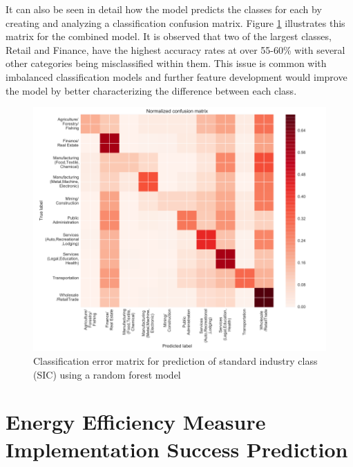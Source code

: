 It can also be seen in detail how the model predicts the classes for each by creating and analyzing a classification confusion matrix. Figure \ref{fig:industry_classification} illustrates this matrix for the combined model. It is observed that two of the largest classes, Retail and Finance, have the highest accuracy rates at over 55-60\% with several other categories being misclassified within them.  This issue is common with imbalanced classification models and further feature development would improve the model by better characterizing the difference between each class.


\begin{figure}[ht!]
\begin{center}
\includegraphics[width=1\columnwidth]{figures/classificationconfusionmatrix/classificationconfusionmatrix}
\caption{{Classification error matrix for prediction of standard industry class (SIC) using a random forest model
\label{fig:industry_classification}%
}}
\end{center}
\end{figure}

\section{Energy Efficiency Measure Implementation Success Prediction}
\label{sec:measuresuccess}

